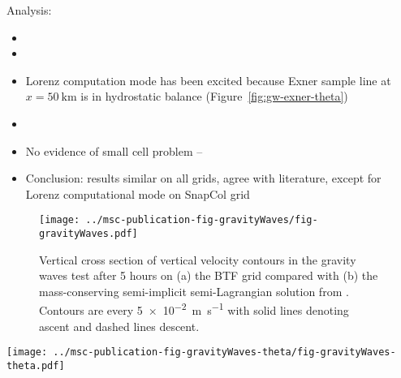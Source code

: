 \documentclass[twocol]{ametsoc}
\begin{document}
Analysis:
\begin{itemize}
	\item {}
	\item {}
	\item Lorenz computation mode has been excited because Exner sample line at $x = \SI{50}{\kilo\meter}$ is in hydrostatic balance (Figure~\ref{fig:gw-exner-theta})
	\item {}
	\item No evidence of small cell problem -- 
	\item Conclusion: results similar on all grids, agree with literature, except for Lorenz computational mode on SnapCol grid
\end{itemize}

\begin{figure}
	\centering
	\texttt{[image: ../msc-publication-fig-gravityWaves/fig-gravityWaves.pdf]}
%
	\caption{Vertical cross section of vertical velocity contours in the gravity waves test after 5 hours on (a) the BTF grid compared with (b) the mass-conserving semi-implicit semi-Lagrangian solution from \citet{melvin2010}.  Contours are every \SI{5e-2}{\meter\per\second} with solid lines denoting ascent and dashed lines descent.}
	\label{fig:gw-w}
\end{figure}

\begin{figure*}
	\centering
	\texttt{[image: ../msc-publication-fig-gravityWaves-theta/fig-gravityWaves-theta.pdf]}
%
	\caption{Anomalies in potential temperature in the gravity waves test after 5 hours with a mountain height, \(h_0 = \SI{250}{\meter}\).  The central domain in the lowest \SI{12}{\kilo\meter} is shown on (a) the BTF grid, and (c) the cut cell grid.  The four lowest layers of each grid are shown for (b) BTF, and (d) cut cell grids, using a narrower potential temperature scale.  The results on the SLEVE grid (not shown) are qualitatively identical to results on the BTF grid.}
	\label{fig:gw-theta}
\end{figure*}
\end{document}
